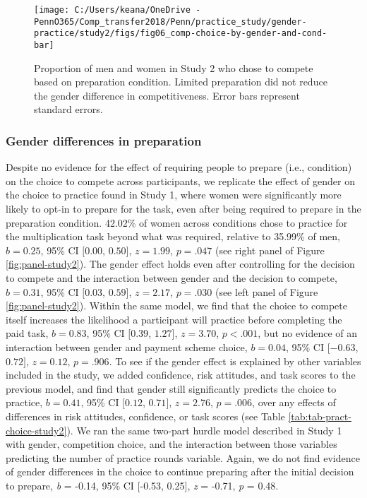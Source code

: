 \documentclass[letterpaper, nobind]{templates/ociamthesis}
\begin{document}
\begin{figure}

{\centering \texttt{[image: C:/Users/keana/OneDrive - PennO365/Comp\_transfer2018/Penn/practice\_study/gender-practice/study2/figs/fig06\_comp-choice-by-gender-and-cond-bar]} 

}

\caption{Proportion of men and women in Study 2 who chose to compete based on preparation condition. Limited preparation did not reduce the gender difference in competitiveness. Error bars represent standard errors.}\label{fig:s200}
\end{figure}

\hypertarget{gender-differences-in-preparation-2}{%
\subsubsection{Gender differences in preparation}\label{gender-differences-in-preparation-2}}

Despite no evidence for the effect of requiring people to prepare (i.e., condition) on the choice to compete across participants, we replicate the effect of gender on the choice to practice found in Study 1, where women were significantly more likely to opt-in to prepare for the task, even after being required to prepare in the preparation condition. 42.02\% of women across conditions chose to practice for the multiplication task beyond what was required, relative to 35.99\% of men, \(b = 0.25\), 95\% CI \([0.00\), \(0.50]\), \(z = 1.99\), \(p = .047\) (see right panel of Figure \ref{fig:panel-study2}). The gender effect holds even after controlling for the decision to compete and the interaction between gender and the decision to compete, \(b = 0.31\), 95\% CI \([0.03\), \(0.59]\), \(z = 2.17\), \(p = .030\) (see left panel of Figure \ref{fig:panel-study2}). Within the same model, we find that the choice to compete itself increases the likelihood a participant will practice before completing the paid task, \(b = 0.83\), 95\% CI \([0.39\), \(1.27]\), \(z = 3.70\), \(p < .001\), but no evidence of an interaction between gender and payment scheme choice, \(b = 0.04\), 95\% CI \([-0.63\), \(0.72]\), \(z = 0.12\), \(p = .906\). To see if the gender effect is explained by other variables included in the study, we added confidence, risk attitudes, and task scores to the previous model, and find that gender still significantly predicts the choice to practice, \(b = 0.41\), 95\% CI \([0.12\), \(0.71]\), \(z = 2.76\), \(p = .006\), over any effects of differences in risk attitudes, confidence, or task scores (see Table \ref{tab:tab-pract-choice-study2}). We ran the same two-part hurdle model described in Study 1 with gender, competition choice, and the interaction between those variables predicting the number of practice rounds variable. Again, we do not find evidence of gender differences in the choice to continue preparing after the initial decision to prepare, \emph{b} = -0.14, 95\% CI {[}-0.53, 0.25{]}, \emph{z} = -0.71, \emph{p} = 0.48.
\end{document}

